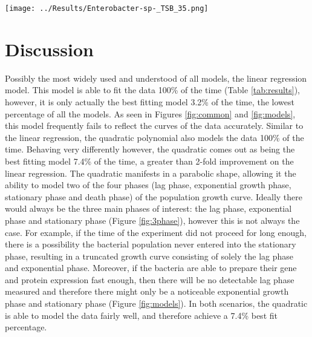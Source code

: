 \documentclass[11pt, a4paper]{article} %
\begin{document}
\begin{SCfigure}[][h!]
\centering
\texttt{[image: ../Results/Enterobacter-sp-\_TSB\_35.png]}
\caption{A plot showing all the models converging on the dataset where \textit{Enterobacter sp} is growing on a TSB medium at 35\textcelsius{}. Here we have a two phase growth curve, with a exponential phase and a stationary phase.}
\label{fig:models}
\end{SCfigure}


\section{Discussion}

Possibly the most widely used and understood of all models, the linear regression model. This model is able to fit the data 100\% of the time (Table \ref{tab:results}), however, it is only actually the best fitting model 3.2\% of the time, the lowest percentage of all the models. As seen in Figures \ref{fig:common} and \ref{fig:models}, this model frequently fails to reflect the curves of the data accurately. Similar to the linear regression, the quadratic polynomial also models the data 100\% of the time. Behaving very differently however, the quadratic comes out as being the best fitting model 7.4\% of the time, a greater than 2-fold improvement on the linear regression. The quadratic manifests in a parabolic shape, allowing it the ability to model two of the four phases (lag phase, exponential growth phase, stationary phase and death phase) of the population growth curve. Ideally there would always be the three main phases of interest: the lag phase, exponential phase and stationary phase \citep{RN106} (Figure \ref{fig:3phase}), however this is not always the case. For example, if the time of the experiment did not proceed for long enough, there is a possibility the bacterial population never entered into the stationary phase, resulting in a truncated growth curve consisting of solely the lag phase and exponential phase. Moreover, if the bacteria are able to prepare their gene and protein expression fast enough, then there will be no detectable lag phase measured and therefore there might only be a noticeable exponential growth phase and stationary phase (Figure \ref{fig:models}). In both scenarios, the quadratic is able to model the data fairly well, and therefore achieve a 7.4\% best fit percentage.
\end{document}

